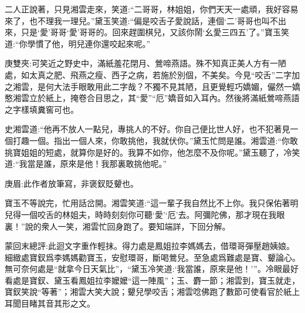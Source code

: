 \begin{parag}
    二人正說著，只見湘雲走來，笑道:“二哥哥，林姐姐，你們天天一處頑，我好容易來了，也不理我一理兒。”黛玉笑道:“偏是咬舌子愛說話，連個‘二’哥哥也叫不出來，只是‘愛’哥哥‘愛’哥哥的。回來趕圍棋兒，又該你鬧‘幺愛三四五’了。”寶玉笑道:“你學慣了他，明兒連你還咬起來呢。”\begin{note}庚雙夾:可笑近之野史中，滿紙羞花閉月、鶯啼燕語。殊不知真正美人方有一陋處，如太真之肥、飛燕之瘦、西子之病，若施於別個，不美矣。今見“咬舌”二字加之湘雲，是何大法手眼敢用此二字哉？不獨不見其陋，且更覺輕巧嬌媚，儼然一嬌憨湘雲立於紙上，掩卷合目思之，其“愛”“厄”嬌音如入耳內。然後將滿紙鶯啼燕語之字樣填糞窖可也。\end{note}史湘雲道:“他再不放人一點兒，專挑人的不好。你自己便比世人好，也不犯著見一個打趣一個。指出一個人來，你敢挑他，我就伏你。”黛玉忙問是誰。湘雲道:“你敢挑寶姐姐的短處，就算你是好的。我算不如你，他怎麼不及你呢。”黛玉聽了，冷笑道:“我當是誰，原來是他！我那裏敢挑他呢。”\begin{note}庚眉:此作者放筆寫，非褒釵貶顰也。\end{note}寶玉不等說完，忙用話岔開。湘雲笑道:“這一輩子我自然比不上你。我只保佑著明兒得一個咬舌的林姐夫，時時刻刻你可聽‘愛’‘厄’去。阿彌陀佛，那才現在我眼裏！”說的衆人一笑，湘雲忙回身跑了。要知端詳，下回分解。
\end{parag}


\begin{parag}
    \begin{note}蒙回末總評:此迴文字重作輕抹。得力處是鳳姐拉李媽媽去，借環哥彈壓趙姨娘。細緻處寶釵爲李媽媽勸寶玉，安慰環哥，斷喝鶯兒。至急處爲難處是寶、顰論心。無可奈何處是“就拿今日天氣比”，“黛玉冷笑道:‘我當誰，原來是他！’”。冷眼最好看處是寶釵、黛玉看鳳姐拉李嬤嬤“這一陣風”；玉、麝一節；湘雲到，寶玉就走，寶釵笑說“等著”；湘雲大笑大說；顰兒學咬舌；湘雲唸佛跑了數節可使看官於紙上耳聞目睹其音其形之文。\end{note}
\end{parag}